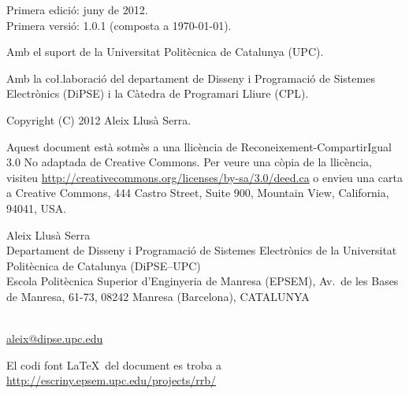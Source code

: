 {
  \thispagestyle{empty}

  \mbox{}

  \vfill

  Primera edició: juny de 2012. %
  \\
  {\small Primera versió: 1.0.1 (composta a \today).} 

  \mbox{}

  {\footnotesize
  Amb el suport de la Universitat Politècnica de Catalunya (UPC).
  
  Amb la co\l.laboració del
  departament de Disseny i Programació de Sistemes Electrònics
  (DiPSE) i la Càtedra de Programari Lliure (CPL).
  }

  \mbox{}

  \cc\bysa

  {\small
  Copyright (C) 2012 Aleix Llusà Serra.
  

  {\footnotesize
    Aquest document està sotmès a una llicència de Reconeixement-CompartirIgual 3.0 No adaptada de Creative Commons. Per veure una còpia de la llicència, visiteu \url{http://creativecommons.org/licenses/by-sa/3.0/deed.ca} o envieu una carta a Creative Commons, 444 Castro Street, Suite 900, Mountain View, California, 94041, USA.
  }


    Aleix Llusà Serra\\
    Departament de Disseny i Programació de Sistemes Electrònics
      de la Universitat Politècnica de Catalunya (DiPSE--UPC)\\
    Escola Politècnica Superior d'Enginyeria de Manresa (EPSEM),
    Av.\ de les Bases de Manresa, 61-73,
    08242 Manresa (Barcelona),
    CATALUNYA 
    }\\
    \url{aleix@dipse.upc.edu}

    {\footnotesize
      El codi font \LaTeX\ del document es troba a 
      \url{http://escriny.epsem.upc.edu/projects/rrb/}
    }
}



